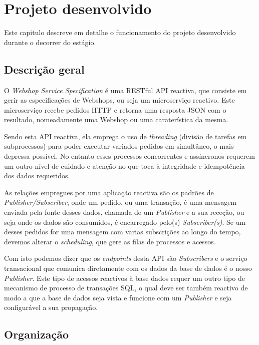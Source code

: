 \chapter{Projeto desenvolvido}\label{cap5}

Este capitulo descreve em detalhe o funcionamento do projeto desenvolvido durante o decorrer do estágio.

\section{Descrição geral}

O \textit{Webshop Service Specification} é uma RESTful API reactiva, que consiste em gerir as especificações de Webshops, ou seja um microserviço reactivo. Este microserviço recebe pedidos HTTP e retorna uma resposta JSON com o resultado, nomeadamente uma Webshop ou uma caraterística da mesma.

Sendo esta API reactiva, ela emprega o uso de \textit{threading} (divisão de tarefas em subprocessos) para poder executar variados pedidos em simultâneo, o mais depressa possível. No entanto esses processos concorrentes e assíncronos requerem um outro nível de cuidado e atenção no que toca à integridade e idempotência dos dados requeridos.

As relações empregues por uma aplicação reactiva são os padrões de \textit{Publisher/Subscriber}, onde um pedido, ou uma transação, é uma mensagem enviada pela fonte desses dados, chamada de um \textit{Publisher} e a sua receção, ou seja onde os dados são consumidos, é encarregado pelo(s) \textit{Subscriber(s)}. Se um desses pedidos for uma mensagem com varias subscrições ao longo do tempo, devemos alterar o \textit{scheduling}, que gere as filas de processos e acessos.

Com isto podemos dizer que os \textit{endpoints} desta API são \textit{Subscribers} e o serviço transacional que comunica diretamente com os dados da base de dados é o nosso \textit{Publisher}. Este tipo de acessos reactivos à base dados requer um outro tipo de mecanismo de processo de transações SQL, o qual deve ser também reactivo de modo a que a base de dados seja vista e funcione com um \textit{Publisher} e seja configurável a sua propagação.

\newpage

\section{Organização}

